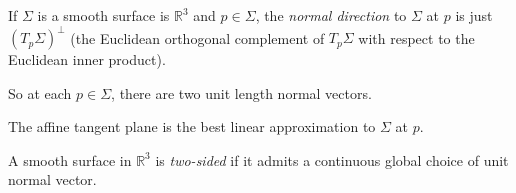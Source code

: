 \begin{definition}
    If \(\Sigma\) is a smooth surface is \(\mathbb{R}^3\) and \(p\in \Sigma\), the \textit{normal direction} to \(\Sigma\) at \(p\) is just \((T_p\Sigma)^{\perp}\) (the Euclidean orthogonal complement of \(T_p\Sigma\) with respect to the Euclidean inner product).

    So at each \(p \in \Sigma\), there are two unit length normal vectors.
\end{definition}
The affine tangent plane is the best linear approximation to \(\Sigma\) at \(p\).
\begin{definition}
    A smooth surface in \(\mathbb{R}^3\) is \textit{two-sided} if it admits a continuous global choice of unit normal vector.
\end{definition}